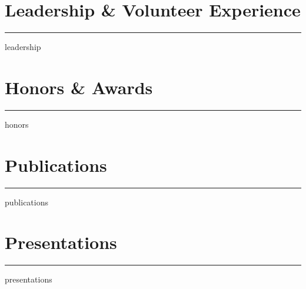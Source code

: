 \documentclass[letter,11pt]{article}
\begin{document}
\section{Leadership \& Volunteer  Experience}
\vspace*{5pt}
\hrule
\vspace*{5pt}
{leadership}
\vspace*{5pt}

\section{Honors \& Awards}
\vspace*{5pt}
\hrule
\vspace*{5pt}
{honors}
\vspace*{5pt}

\section{Publications}
\vspace*{5pt}
\hrule
\vspace*{5pt}
{publications}
\vspace*{5pt}

\section{Presentations}
\vspace*{5pt}
\hrule
\vspace*{5pt}
{presentations}
\vspace*{5pt}
\end{document}
